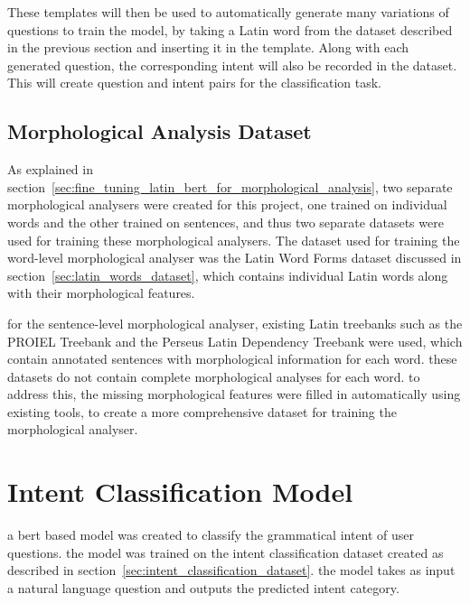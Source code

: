 These templates will then be used to automatically generate 
many variations of questions to train the model, by taking a 
Latin word from the dataset described in the previous section 
and inserting it in the template. Along with each generated 
question, the corresponding intent will also be recorded in 
the dataset. This will create question and intent pairs for 
the classification task.


\subsection{Morphological Analysis Dataset}
\label{sec:morphological_analysis_dataset}

As explained in section~\ref{sec:fine_tuning_latin_bert_for_morphological_analysis}, two separate morphological analysers were created for this project, one trained on individual words and the other trained on sentences, and thus two separate datasets were used for training these morphological analysers.
The dataset used for training the word-level morphological analyser was the Latin Word Forms dataset discussed in section~\ref{sec:latin_words_dataset}, which contains individual Latin words along with their morphological features.

for the sentence-level morphological analyser, existing Latin treebanks such as the PROIEL Treebank and the Perseus Latin Dependency Treebank were used, which contain annotated sentences with morphological information for each word.
these datasets do not contain complete morphological analyses for each word.
to address this, the missing morphological features were filled in automatically using existing tools, to create a more comprehensive dataset for training the morphological analyser.

\section{Intent Classification Model}%
\label{sec:intent_classification_model}

a bert based model was created to classify the grammatical intent of user questions.
the model was trained on the intent classification dataset created as described in section~\ref{sec:intent_classification_dataset}.
the model takes as input a natural language question and outputs the predicted intent category.

